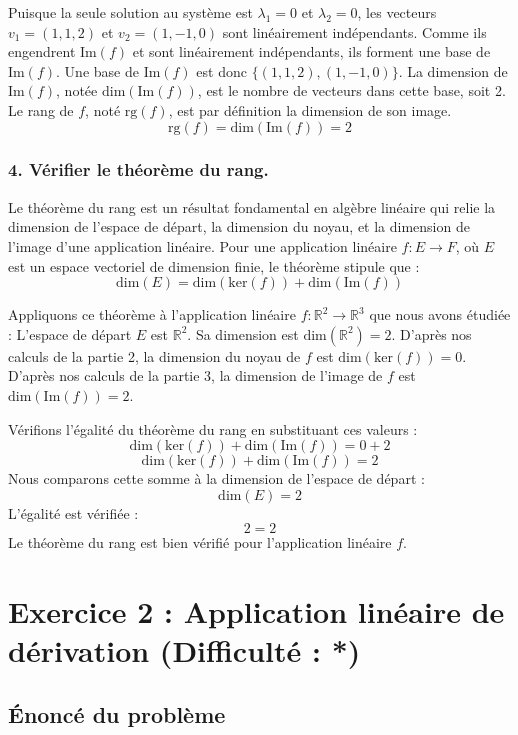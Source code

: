\documentclass{report}
\begin{document}
Puisque la seule solution au système est $\lambda_1 = 0$ et $\lambda_2 = 0$, les vecteurs $v_1 = (1,1,2)$ et $v_2 = (1,-1,0)$ sont linéairement indépendants.
Comme ils engendrent $\text{Im}(f)$ et sont linéairement indépendants, ils forment une base de $\text{Im}(f)$.
Une base de $\text{Im}(f)$ est donc $\{(1,1,2), (1,-1,0)\}$.
La dimension de $\text{Im}(f)$, notée $\text{dim}(\text{Im}(f))$, est le nombre de vecteurs dans cette base, soit 2.
Le rang de $f$, noté $\text{rg}(f)$, est par définition la dimension de son image.
$$\text{rg}(f) = \text{dim}(\text{Im}(f)) = 2$$

\subsection*{4. Vérifier le théorème du rang.}

Le théorème du rang est un résultat fondamental en algèbre linéaire qui relie la dimension de l'espace de départ, la dimension du noyau, et la dimension de l'image d'une application linéaire. Pour une application linéaire $f: E \to F$, où $E$ est un espace vectoriel de dimension finie, le théorème stipule que :
$$\text{dim}(E) = \text{dim}(\text{ker}(f)) + \text{dim}(\text{Im}(f))$$

Appliquons ce théorème à l'application linéaire $f: \mathbb{R}^2 \to \mathbb{R}^3$ que nous avons étudiée :
L'espace de départ $E$ est $\mathbb{R}^2$. Sa dimension est $\text{dim}(\mathbb{R}^2) = 2$.
D'après nos calculs de la partie 2, la dimension du noyau de $f$ est $\text{dim}(\text{ker}(f)) = 0$.
D'après nos calculs de la partie 3, la dimension de l'image de $f$ est $\text{dim}(\text{Im}(f)) = 2$.

Vérifions l'égalité du théorème du rang en substituant ces valeurs :
$$\text{dim}(\text{ker}(f)) + \text{dim}(\text{Im}(f)) = 0 + 2$$
$$\text{dim}(\text{ker}(f)) + \text{dim}(\text{Im}(f)) = 2$$
Nous comparons cette somme à la dimension de l'espace de départ :
$$\text{dim}(E) = 2$$
L'égalité est vérifiée :
$$2 = 2$$
Le théorème du rang est bien vérifié pour l'application linéaire $f$.

\newpage
\chapter*{Exercice 2 : Application linéaire de dérivation (Difficulté : *)}

\section*{Énoncé du problème}
\end{document}
